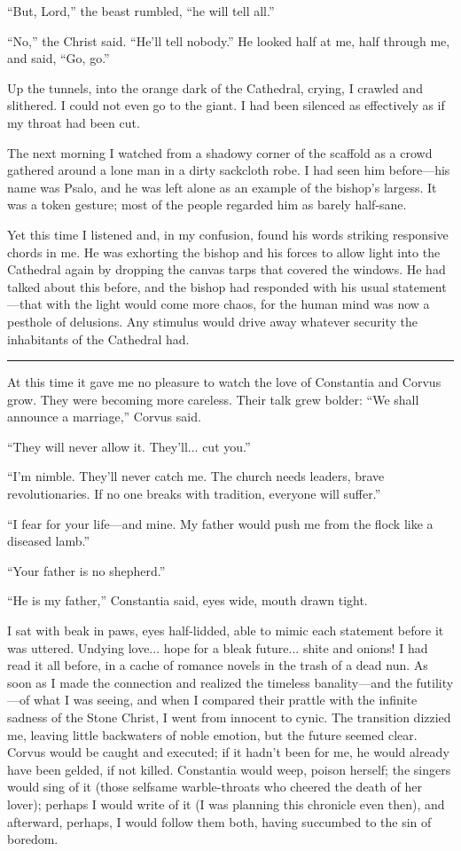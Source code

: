 ``But, Lord,'' the beast rumbled, ``he will tell all.''

``No,'' the Christ said. ``He'll tell nobody.'' He looked half at me, half through me, and said, ``Go, go.''

Up the tunnels, into the orange dark of the Cathedral, crying, I crawled and slithered. I could not even go to the giant. I had been silenced as effectively as if my throat had been cut.

The next morning I watched from a shadowy corner of the scaffold as a crowd gathered around a lone man in a dirty sackcloth robe. I had seen him before—his name was Psalo, and he was left alone as an example of the bishop's largess. It was a token gesture; most of the people regarded him as barely half-sane.

Yet this time I listened and, in my confusion, found his words striking responsive chords in me. He was exhorting the bishop and his forces to allow light into the Cathedral again by dropping the canvas tarps that covered the windows. He had talked about this before, and the bishop had responded with his usual statement—that with the light would come more chaos, for the human mind was now a pesthole of delusions. Any stimulus would drive away whatever security the inhabitants of the Cathedral had.

\fancybreak{* * *}

At this time it gave me no pleasure to watch the love of Constantia and Corvus grow. They were becoming more careless. Their talk grew bolder: ``We shall announce a marriage,'' Corvus said.

``They will never allow it. They'll... cut you.''

``I'm nimble. They'll never catch me. The church needs leaders, brave revolutionaries. If no one breaks with tradition, everyone will suffer.''

``I fear for your life—and mine. My father would push me from the flock like a diseased lamb.''

``Your father is no shepherd.''

``He is my father,'' Constantia said, eyes wide, mouth drawn tight.

I sat with beak in paws, eyes half-lidded, able to mimic each statement before it was uttered. Undying love... hope for a bleak future... shite and onions! I had read it all before, in a cache of romance novels in the trash of a dead nun. As soon as I made the connection and realized the timeless banality—and the futility—of what I was seeing, and when I compared their prattle with the infinite sadness of the Stone Christ, I went from innocent to cynic. The transition dizzied me, leaving little backwaters of noble emotion, but the future seemed clear. Corvus would be caught and executed; if it hadn't been for me, he would already have been gelded, if not killed. Constantia would weep, poison herself; the singers would sing of it (those selfsame warble-throats who cheered the death of her lover); perhaps I would write of it (I was planning this chronicle even then), and afterward, perhaps, I would follow them both, having succumbed to the sin of boredom.

